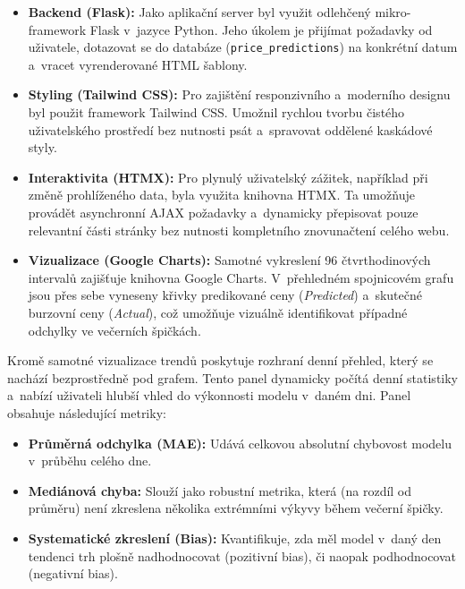 \documentclass[a4paper]{article}
\begin{document}
\begin{itemize}
    \item \textbf{Backend (Flask):} Jako aplikační server byl využit 
    odlehčený mikro-framework Flask v~jazyce Python. Jeho úkolem je 
    přijímat požadavky od uživatele, dotazovat se do databáze 
    (\texttt{price\_predictions}) na konkrétní datum a~vracet 
    vyrenderované HTML šablony.
    
    \item \textbf{Styling (Tailwind CSS):} Pro zajištění responzivního 
    a~moderního designu byl použit framework Tailwind CSS. 
    Umožnil rychlou tvorbu čistého uživatelského prostředí bez nutnosti 
    psát a~spravovat oddělené kaskádové styly.
    
    \item \textbf{Interaktivita (HTMX):} Pro plynulý uživatelský zážitek, 
    například při změně prohlíženého data, byla využita knihovna HTMX. 
    Ta umožňuje provádět asynchronní AJAX požadavky a~dynamicky 
    přepisovat pouze relevantní části stránky bez 
    nutnosti kompletního znovunačtení celého webu.
    
    \item \textbf{Vizualizace (Google Charts):} Samotné vykreslení 
    96 čtvrthodinových intervalů zajišťuje knihovna Google Charts. 
    V~přehledném spojnicovém grafu jsou přes sebe vyneseny křivky 
    predikované ceny (\textit{Predicted}) a~skutečné burzovní ceny 
    (\textit{Actual}), což umožňuje vizuálně identifikovat případné 
    odchylky ve večerních špičkách.
\end{itemize}

Kromě samotné vizualizace trendů poskytuje rozhraní denní přehled, který se nachází bezprostředně pod grafem. Tento panel dynamicky počítá denní statistiky a~nabízí uživateli hlubší vhled do výkonnosti 
modelu v~daném dni. Panel obsahuje následující metriky:
\begin{itemize}
    \item \textbf{Průměrná odchylka (MAE):} Udává celkovou absolutní chybovost modelu v~průběhu celého dne.
    \item \textbf{Mediánová chyba:} Slouží jako robustní metrika, která (na rozdíl od průměru) není zkreslena několika extrémními výkyvy během večerní špičky.
    \item \textbf{Systematické zkreslení (Bias):} Kvantifikuje, zda měl model v~daný den tendenci trh plošně nadhodnocovat (pozitivní bias), či naopak podhodnocovat (negativní bias).
\end{itemize}
\end{document}
